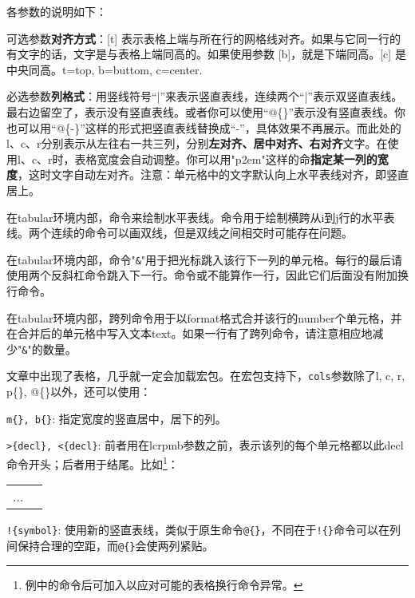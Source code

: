 各参数的说明如下：
\begin{feai}
\item 可选参数\textbf{对齐方式}：[t] 表示表格上端与所在行的网格线对齐。如果与它同一行的有文字的话，文字是与表格上端同高的。如果使用参数 [b]，就是下端同高。[c] 是中央同高。t=top, b=buttom, c=center.
\item 必选参数\textbf{列格式}：用竖线符号“|”来表示竖直表线，连续两个“|”表示双竖直表线。最右边留空了，表示没有竖直表线。或者你可以使用“@\{\}”表示没有竖直表线。你也可以用“@\{-\}”这样的形式把竖直表线替换成“-”，具体效果不再展示。而此处的l、c、r分别表示从左往右一共三列，分别\textbf{左对齐、居中对齐、右对齐}文字。在使用l、c、r时，表格宽度会自动调整。你可以用"p{2em}"这样的命\textbf{指定某一列的宽度}，这时文字自动左对齐。注意：单元格中的文字默认向上水平表线对齐，即竖直居上。
\item 在tabular环境内部，命令来绘制水平表线。命令用于绘制横跨从i到j行的水平表线。两个连续的命令可以画双线，但是双线之间相交时可能存在问题。
\item 在tabular环境内部，命令"\texttt{\&}"用于把光标跳入该行下一列的单元格。每行的最后请使用两个反斜杠命令跳入下一行。命令或不能算作一行，因此它们后面没有附加换行命令。
\item 在tabular环境内部，跨列命令用于以format格式合并该行的number个单元格，并在合并后的单元格中写入文本text。如果一行有了跨列命令，请注意相应地减少"\texttt{\&}"的数量。
\end{feai}

文章中出现了表格，几乎就一定会加载宏包。在宏包支持下，\texttt{cols}参数除了l, c, r, p\{\}, @\{\}以外，还可以使用：
\begin{feai}
\item \texttt{m\{\}, b\{\}}: 指定宽度的竖直居中，居下的列。
\item \verb|>{decl}, <{decl}|: 前者用在lcrpmb参数之前，表示该列的每个单元格都以此decl命令开头；后者用于结尾。比如\footnote{例中的命令后可加入以应对可能的表格换行命令异常。}：
\begin{latex}
\begin{tabular}{|>{\centering\ttfamily}p{5em}
    |>{$}c<{$}|}
...
\end{tabular}
\end{latex}
\item \verb|!{symbol}|:  使用新的竖直表线，类似于原生命令\texttt{@\{\}}，不同在于\verb|!{}|命令可以在列间保持合理的空距，而\verb|@{}|会使两列紧贴。
\end{feai}

